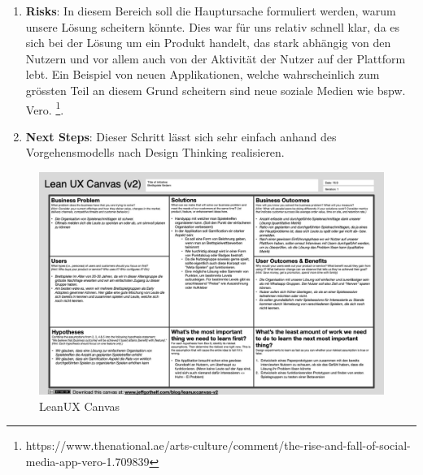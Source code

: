 \begin{enumerate}
    \item \textbf{Risks}: In diesem Bereich soll die Hauptursache formuliert werden, warum unsere Lösung scheitern könnte. Dies war für uns relativ schnell klar, da es sich bei der Lösung um ein Produkt handelt, das stark abhängig von den Nutzern und vor allem auch von der Aktivität der Nutzer auf der Plattform lebt. Ein Beispiel von neuen Applikationen, welche wahrscheinlich zum grössten Teil an diesem Grund scheitern sind neue soziale Medien wie bspw. Vero. \footnote{https://www.thenational.ae/arts-culture/comment/the-rise-and-fall-of-social-media-app-vero-1.709839}.
    \item \textbf{Next Steps}: Dieser Schritt lässt sich sehr einfach anhand des Vorgehensmodells nach Design Thinking realisieren.
\end{enumerate}

\begin{landscape}
    \begin{figure}[H] 
        \includegraphics[width=24cm]{images/LeanUXCanvas.jpg}
        \caption{LeanUX Canvas}
        \label{lean_ux_canvas_image}  
    \end{figure}
\end{landscape}
\restoregeometry 

